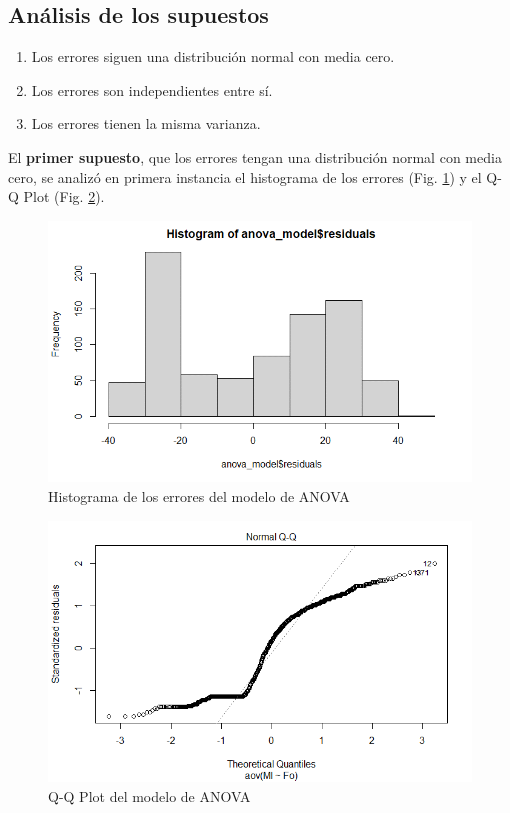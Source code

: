 \documentclass[a4paper,10pt,twocolumn]{article}
\begin{document}
\subsection{Análisis de los supuestos}\label{sec:anova_sup}

\begin{enumerate}
	\item Los errores siguen una distribución normal con media cero.
	\item Los errores son independientes entre sí.
	\item Los errores tienen la misma varianza.
\end{enumerate}

El \textbf{primer supuesto}, que los errores tengan una distribución normal con media cero, se analizó en primera instancia el histograma de los errores (Fig. \ref{fig:anova_his}) y el Q-Q Plot (Fig. \ref{fig:anova_qq}).

\begin{figure}[htb]%
	\begin{center}
		\includegraphics[width=\linewidth]{anova_his}
	\end{center}
	\caption{Histograma de los errores del modelo de ANOVA \label{fig:anova_his}}%
\end{figure}

\begin{figure}[htb]%
	\begin{center}
		\includegraphics[width=\linewidth]{anova_qq}
	\end{center}
	\caption{Q-Q Plot del modelo de ANOVA \label{fig:anova_qq}}%
\end{figure}
\end{document}
